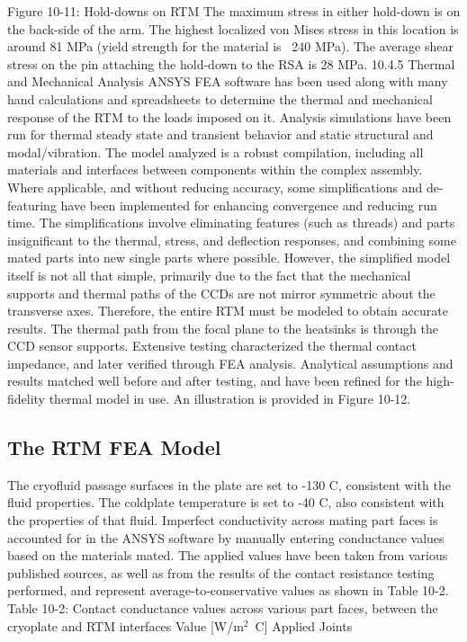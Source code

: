 Figure 10-11: Hold-downs on RTM
The maximum stress in either hold-down is on the back-side of the arm. The highest localized von Mises stress in this location is around 81 MPa (yield strength for the material is ~240 MPa). The average shear stress on the pin attaching the hold-down to the RSA is 28 MPa.
10.4.5	Thermal and Mechanical Analysis
ANSYS FEA software has been used along with many hand calculations and spreadsheets to determine the thermal and mechanical response of the RTM to the loads imposed on it. Analysis simulations have been run for thermal steady state and transient behavior and static structural and modal/vibration. The model analyzed is a robust compilation, including all materials and interfaces between components within the complex assembly. Where applicable, and without reducing accuracy, some simplifications and de-featuring have been implemented for enhancing convergence and reducing run time. The simplifications involve eliminating features (such as threads) and parts insignificant to the thermal, stress, and deflection responses, and combining some mated parts into new single parts where possible. However, the simplified model itself is not all that simple, primarily due to the fact that the mechanical supports and thermal paths of the CCDs are not mirror symmetric about the transverse axes. Therefore, the entire RTM must be modeled to obtain accurate results. 
The thermal path from the focal plane to the heatsinks is through the CCD sensor supports. Extensive testing characterized the thermal contact impedance, and later verified through FEA analysis. Analytical assumptions and results matched well before and after testing, and have been refined for the high-fidelity thermal model in use. An illustration is provided in Figure 10-12. 

\subsection{The RTM FEA Model}
The cryofluid passage surfaces in the plate are set to -130 C, consistent with the fluid properties. The coldplate temperature is set to -40 C, also consistent with the properties of that fluid.
Imperfect conductivity across mating part faces is accounted for in the ANSYS software by manually entering conductance values based on the materials mated. The applied values have been taken from various published sources, as well as from the results of the contact resistance testing performed, and represent average-to-conservative values as shown in Table 10-2.
Table 10-2: Contact conductance values across various part faces, between the cryoplate and RTM interfaces
Value [W/m$^2$~C]
Applied Joints

